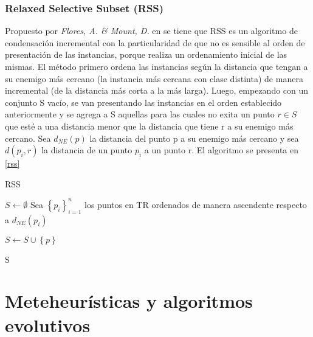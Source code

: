 \subsubsection{Relaxed Selective Subset (RSS)}

 Propuesto por \emph{Flores, A. \& Mount, D.} en \cite{floresnearest} se tiene que RSS es un algoritmo de condensación incremental con la particularidad de que no es sensible al orden de presentación de las instancias, porque realiza un ordenamiento inicial de las mismas. El método primero ordena las instancias según la distancia que tengan a su enemigo más cercano (la instancia más cercana con clase distinta) de manera incremental (de la distancia más corta a la más larga). Luego, empezando con un conjunto S vacío, se van presentando las instancias en el orden establecido anteriormente y se agrega a S aquellas para las cuales no exita un punto $r \in S$ que esté a una distancia menor que la distancia que tiene r a su enemigo más cercano. Sea $d_{NE}(p)$ la distancia del punto p a su enemigo más cercano y sea $d(p_i,r)$ la distancia de un punto $p_i$ a un punto r. El algoritmo se presenta en \ref{rss}

\begin{algorithm}
\caption{RSS}
\label{rss}
\begin{algorithmic}[1]


\State $S \gets \emptyset$
\State Sea $\left\{p_i\right\}_{i=1}^n$ los puntos en TR ordenados de manera ascendente respecto a $d_{NE}(p_i)$

		\State $S \gets S \cup \left\{p\right\}$
	\EndIf
\EndFor

\State \Return S

\end{algorithmic}
\end{algorithm}


\section{Meteheurísticas y algoritmos evolutivos}

